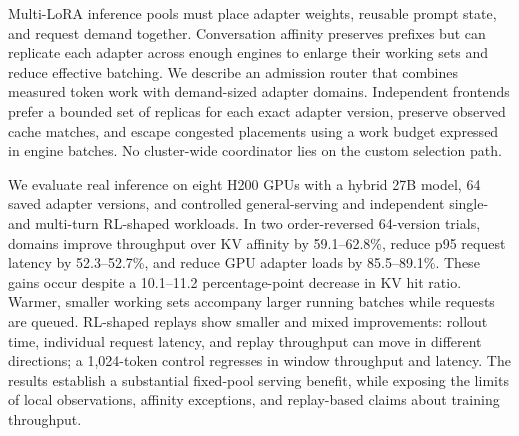 Multi-LoRA inference pools must place adapter weights, reusable prompt state,
and request demand together. Conversation affinity preserves prefixes but can
replicate each adapter across enough engines to enlarge their working sets and
reduce effective batching. We describe an admission router that combines
measured token work with demand-sized adapter domains. Independent frontends
prefer a bounded set of replicas for each exact adapter version, preserve
observed cache matches, and escape congested placements using a work budget
expressed in engine batches. No cluster-wide coordinator lies on the custom
selection path.

We evaluate real inference on eight H200 GPUs with a hybrid 27B model,
64 saved adapter versions, and controlled general-serving and independent
single- and multi-turn RL-shaped workloads. In two order-reversed 64-version
trials, domains improve throughput over KV affinity by 59.1--62.8\%, reduce
p95 request latency by 52.3--52.7\%, and reduce GPU adapter loads by
85.5--89.1\%. These gains occur despite a 10.1--11.2 percentage-point decrease in KV
hit ratio. Warmer, smaller working sets accompany larger running batches while
requests are queued. RL-shaped replays show smaller and mixed improvements:
rollout time, individual request latency, and replay throughput can move in
different directions; a 1,024-token control regresses in window throughput and
latency. The results establish a substantial fixed-pool serving
benefit, while exposing the limits of local observations, affinity exceptions,
and replay-based claims about training throughput.
